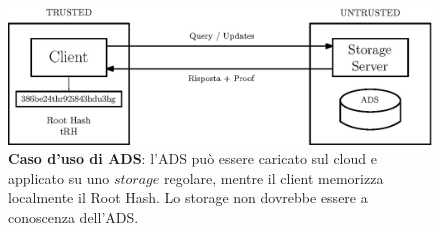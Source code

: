 		\begin{figure}
			\centering
			\includegraphics[scale=0.75]{figure/trusted-untrusted.eps}
			\caption{\textbf{Caso d'uso di ADS}: l'ADS può essere caricato sul cloud e applicato su uno $ storage $ regolare, mentre il client memorizza localmente il Root Hash. Lo storage non dovrebbe essere a conoscenza dell'ADS.}\label{fig:3}
		\end{figure}
		
